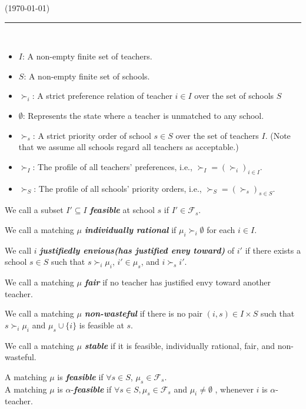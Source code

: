\documentclass[a4j,10pt]{jsarticle}
\theoremstyle{definition}
\theoremstyle{remark}
\theoremstyle{plain}
\begin{document}
 \hfill  (\today)\\
\noindent \rule{\textwidth}{0.2mm} \\
\vspace{-0.4cm}

\begin{itemize}
  \item $I$: A non-empty finite set of teachers.
  \item $S$: A non-empty finite set of schools.
  \item $\succ_i$: A strict preference relation of teacher $i \in I$ over the set of schools $S$
  \item $\emptyset$: Represents the state where a teacher is unmatched to any school.
  \item $\succ_s$: A strict priority order of school $s \in S$ over the set of teachers $I$. (Note that we assume all schools regard all teachers as acceptable.)
  \item $\succ_I$: The profile of all teachers' preferences, i.e., $\succ_I = (\succ_i)_{i \in I}$.
  \item $\succ_S$: The profile of all schools' priority orders, i.e., $\succ_S = (\succ_s)_{s \in S}$.
\end{itemize}

We call a subset $I' \subseteq I$ {\bf \emph{feasible}} at school $s$ if $I' \in \mathcal{F}_s$.

We call a matching $\mu$ {\bf \emph{individually rational} }if $\mu_i \succ_i \emptyset$ for each $i \in I$.

We call $i$ {\bf \emph{justifiedly envious(has justified envy toward)}} of $i'$ if there exists a school $s \in S$ such that $s \succ_i \mu_i$, $i' \in \mu_s$, and $i \succ_s i'$.

We call a matching $\mu$ {\bf \emph{fair}} if no teacher has justified envy toward another teacher.

We call a matching $\mu$ {\bf \emph{non-wasteful}} if there is no pair $(i, s) \in I \times S$ such that $s \succ_i \mu_i$ and $\mu_s \cup \{i\}$ is feasible at $s$.

We call a matching $\mu$ {\bf \emph{stable}} if it is feasible, individually rational, fair, and non-wasteful.

A matching $\mu$ is {\bf \emph{feasible}} if $\forall s \in S$, $\mu_s \in \mathcal{F}_s$.\\



A matching $\mu$ is $\alpha$-{\bf \emph{feasible}} if $\forall s \in S , \mu_s \in \mathcal{F}_s$ and $\mu_i \neq \emptyset$ , whenever $i$ is $\alpha$-teacher. \\
\end{document}
